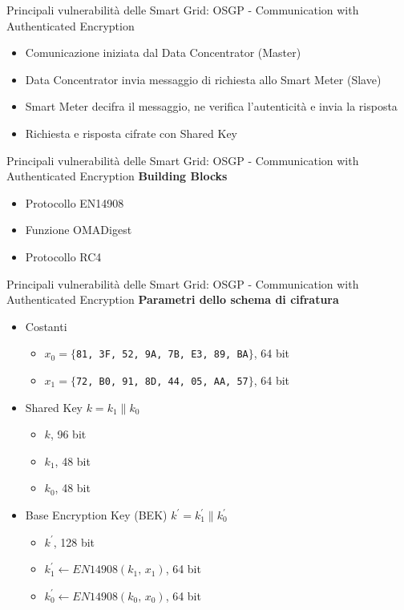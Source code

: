 \begin{frame}{Principali vulnerabilità delle Smart Grid: OSGP - Communication with Authenticated Encryption}
	\begin{itemize}[<+- | alert@+>]
		\item Comunicazione iniziata dal Data Concentrator (Master)
		\item Data Concentrator invia messaggio di richiesta allo Smart Meter (Slave)
		\item Smart Meter decifra il messaggio, ne verifica l'autenticità e invia la risposta
		\item Richiesta e risposta cifrate con Shared Key
	\end{itemize}
\end{frame}


\begin{frame}{Principali vulnerabilità delle Smart Grid: OSGP - Communication with Authenticated Encryption}
	\textbf{Building Blocks}
	\begin{itemize}
		\item Protocollo EN14908
		\item Funzione OMADigest
		\item Protocollo RC4
	\end{itemize}
\end{frame}

\begin{frame}{Principali vulnerabilità delle Smart Grid: OSGP - Communication with Authenticated Encryption}
	\textbf{Parametri dello schema di cifratura}
	\begin{itemize}[<+- | alert@+>]
		\item Costanti
		\begin{itemize}
			\item $x_0 = \{${\tt 81, 3F, 52, 9A, 7B, E3, 89, BA}$\}$, 64 bit
			\item $x_1 = \{${\tt 72, B0, 91, 8D, 44, 05, AA, 57}$\}$, 64 bit
		\end{itemize}
		\item Shared Key $k = k_1 \| k_0$
		\begin{itemize}
			\item $k$, 96 bit
			\item $k_1$, 48 bit
			\item $k_0$, 48 bit
		\end{itemize}
		\item Base Encryption Key (BEK) $k^{\prime} = k_1^{\prime} \| k_0^{\prime}$
		\begin{itemize}
			\item $k^{\prime}$, 128 bit
			\item $k_1^{\prime} \gets EN14908(k_1,\,x_1)$, 64 bit
			\item $k_0^{\prime} \gets EN14908(k_0,\,x_0)$, 64 bit
		\end{itemize}
	\end{itemize}
\end{frame}

